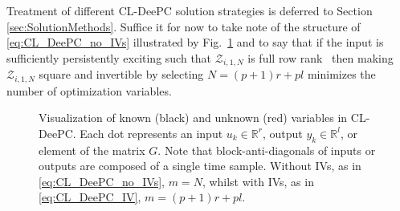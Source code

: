 Treatment of different \ac{CL-DeePC} solution strategies is deferred to Section \ref{sec:SolutionMethods}. Suffice it for now to take note of the structure of \eqref{eq:CL_DeePC_no_IVs} illustrated by Fig.~\ref{fig:CL-DeePC} and to say that if the input is sufficiently persistently exciting such that $\mathcal{Z}_{i,1,N}$ is full row rank~\cite[Chapt.~9.6.1]{Verhaegen2007a} then making $\mathcal{Z}_{i,1,N}$ square and invertible by selecting $N=(p+1)r+pl$ minimizes the number of optimization variables.
% 
% 
\begin{figure}[b!]
\centering

\caption{Visualization of known (black) and unknown (red) variables in \ac{CL-DeePC}. Each dot represents an input $u_k\in\mathbb{R}^r$, output $y_k\in\mathbb{R}^l$, or element of the matrix $G$.
Note that block-anti-diagonals of inputs or outputs are composed of a single time sample. Without \ac{IVs}, as in \eqref{eq:CL_DeePC_no_IVs}, $m=N$, whilst with \ac{IVs}, as in \eqref{eq:CL_DeePC_IV}, $m=(p+1)r+pl$.}
\label{fig:CL-DeePC}
\end{figure}


